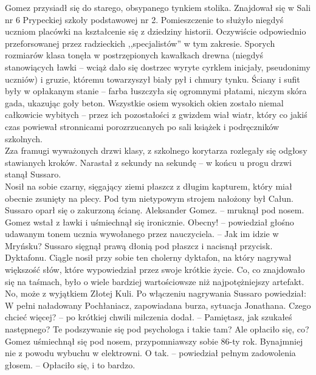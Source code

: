 \documentclass[../MAIN.tex]{subfiles}
\begin{document}
Gomez przysiadł się do starego, obsypanego tynkiem stolika. Znajdował się w Sali nr 6 Prypeckiej szkoły podstawowej nr 2. Pomieszczenie to służyło niegdyś uczniom placówki na kształcenie się z dziedziny historii. Oczywiście odpowiednio przeforsowanej przez radzieckich ,,specjalistów'' w tym zakresie.
Sporych rozmiarów klasa tonęła w postrzępionych kawałkach drewna (niegdyś stanowiących ławki -- wciąż dało się dostrzec wyryte cyrklem inicjały, pseudonimy uczniów) i gruzie, któremu towarzyszył biały pył i chmury tynku. Ściany i sufit były w opłakanym stanie -- farba łuszczyła się ogromnymi płatami, niczym skóra gada, ukazując goły beton. Wszystkie osiem wysokich okien zostało niemal całkowicie wybitych -- przez ich pozostałości z gwizdem wiał wiatr, który co jakiś czas powiewał stronnicami porozrzucanych po sali książek i podręczników szkolnych.\\
Zza framugi wyważonych drzwi klasy, z szkolnego korytarza rozlegały się odgłosy stawianych kroków. Narastał z sekundy na sekundę -- w końcu u progu drzwi stanął Sussaro.\\
Nosił na sobie czarny, sięgający ziemi płaszcz z długim kapturem, który miał obecnie zsunięty na plecy. Pod tym nietypowym strojem nałożony był Całun.
Sussaro oparł się o zakurzoną ścianę.
\sx Aleksander Gomez. -- mruknął pod nosem.
\qd
Gomez wstał z ławki i uśmiechnął się ironicznie.
\sx Obecny! -- powiedział głośno udawanym tonem ucznia wywołanego przez nauczyciela. -- Jak im idzie w Mryńsku?
\qd
Sussaro sięgnął prawą dłonią pod płaszcz i nacisnął przycisk. Dyktafonu. Ciągle nosił przy sobie ten cholerny dyktafon, na który nagrywał większość słów, które wypowiedział przez swoje krótkie życie. Co, co znajdowało się na taśmach, było o wiele bardziej wartościowsze niż najpotężniejszy artefakt. No, może z wyjątkiem Złotej Kuli. Po włączeniu nagrywania Sussaro powiedział:
\sx W pełni naładowany Pochłaniacz, zapowiadana burza, sytuacja Jonathana. Czego chcieć więcej? -- po krótkiej chwili milczenia dodał. -- Pamiętasz, jak szukałeś następnego? Te podszywanie się pod psychologa i takie tam? Ale opłaciło się, co?
\qd
Gomez uśmiechnął się pod nosem, przypomniawszy sobie 86-ty rok. Bynajmniej nie z powodu wybuchu w elektrowni.
\sx O tak. -- powiedział pełnym zadowolenia głosem. -- Opłaciło się, i to bardzo.
\qd
\end{document}
